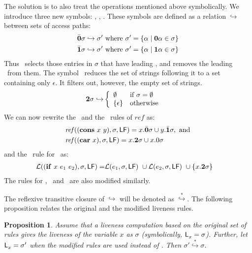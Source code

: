 \documentclass[preprint,9pt]{sigplanconf}
\newcommand{\warning}[1]{{\color{Myred}{#1}}}
\newtheorem{proposition}[theorem]{Proposition}
\begin{document}
The solution is to  also treat the operations mentioned
above  symbolically.  We  introduce three  new symbols:
\bcar, \bcdr,  \clazy.  These symbols are  defined as a
relation  $\hookrightarrow$  between   sets  of  access
paths:
\begin{align*}
  &\bar{\mathbf{0}}\sigma \hookrightarrow \sigma' \mbox{ where } \sigma' = \{\alpha \mid \mathbf{0}\alpha \in \sigma\}\\
  &\bar{\mathbf{1}}\sigma \hookrightarrow \sigma' \mbox{ where } \sigma' = \{\alpha \mid \mathbf{1}\alpha \in \sigma\}
\end{align*}
Thus \bcar\ selects those entries in $\sigma$ that have leading \acar, and removes the leading \acar\ from them.
The symbol \clazy\ reduces the set of strings following it to a set containing only $\epsilon$. It filters out, however, the empty set of strings.
\begin{align*}
  {\mathbf{2}}\sigma \hookrightarrow & \left\{ 
  \begin{array}{ll}
    \emptyset&\mbox{if}~\sigma = \emptyset\\
    \{\epsilon\} & \mbox{otherwise}
  \end{array}\right.
\end{align*}
We can  now rewrite the \CONS\  and the \CAR\  rules of $\mathit{ref}$
as:
\begin{align*}
&\mathit{ref\/}((\mbox{$\mathbf{cons}$}~x~y),\sigma,\mathsf{LF})
= x.\bar{\mathbf{0}}\sigma \cup y.\bar{\mathbf{1}}\sigma  \label{eqn:mod-cons},~
\mbox{and} \\
&\mathit{ref\/}((\mbox{$\mathbf{car}$}~x),\sigma,\mathsf{LF})
          =   x.{\mathbf{2}}\sigma \cup x.0\sigma
\end{align*}
and the \Lfunonly\ rule
for \SIF\ as:
\begin{align*}
\mathcal{L}((\mbox{$\mathbf{ if}$}~x~e_1~e_2),\sigma,\mathsf{LF}) =
                    &\mathcal{L}(e_1,\sigma,\mathsf{LF})~\cup
        \mathcal{L}(e_2,\sigma,\mathsf{LF})~\cup
          \{x.{\mathbf{2}} \sigma\}
\end{align*}
The rules for  \CDR, \PRIM\ and \NULLQ\ are also
modified similarly.


\warning{When   there  are   multiple   occurrences  of   \bcar,
\bcdr\  and \clazy,  $\hookrightarrow$ is  applied from
right  to left.}   The reflexive  transitive closure  of
$\hookrightarrow$      will      be     denoted      as
$\stackrel{*}{\hookrightarrow}$.      The     following
proposition  relates  the  original  and  the  modified
liveness rules. 
\begin{proposition}
Assume  that  a  liveness   computation  based  on  the
original  set  of  rules  gives  the  liveness  of  the
variable  $x$   as $\sigma$
(symbolically,  $\mathsf{L}_{{x}}^{}=  \sigma$).  Further,  let
$\mathsf{L}_{{x}}^{}= \sigma'$ when the modified rules are used
instead      of      \Lfunonly.      Then      $\sigma'
\stackrel{*}{\hookrightarrow} \sigma$.
\end{proposition}
\end{document}
